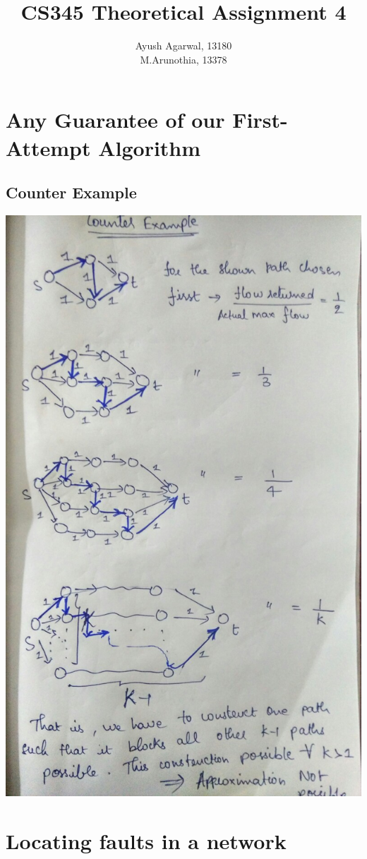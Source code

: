 \documentclass{article}
\title{CS345 Theoretical Assignment 4 \\ }
\author{\vspace{2mm} \large Ayush Agarwal, 13180 \\ M.Arunothia, 13378}
\date{}
\begin{document}
\maketitle
\tableofcontents
\newpage
\section{Any Guarantee of our First-Attempt Algorithm}
\subsection{Counter Example}
\includegraphics[scale=0.5]{1.jpg}
\newpage
\section{Locating faults in a network}
\end{document}
